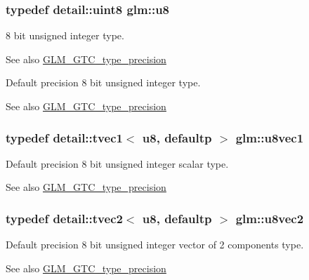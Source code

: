 \subsubsection[{\texorpdfstring{u8}{u8}}]{\setlength{\rightskip}{0pt plus 5cm}typedef detail\+::uint8 {\bf glm\+::u8}}\hypertarget{group__gtc__type__precision_ga5e3dc67373d5068997d2d9f41c9024d2}{}\label{group__gtc__type__precision_ga5e3dc67373d5068997d2d9f41c9024d2}
8 bit unsigned integer type. \begin{DoxySeeAlso}{See also}
\hyperlink{group__gtc__type__precision}{G\+L\+M\+\_\+\+G\+T\+C\+\_\+type\+\_\+precision}
\end{DoxySeeAlso}
Default precision 8 bit unsigned integer type. \begin{DoxySeeAlso}{See also}
\hyperlink{group__gtc__type__precision}{G\+L\+M\+\_\+\+G\+T\+C\+\_\+type\+\_\+precision} 
\end{DoxySeeAlso}
\subsubsection[{\texorpdfstring{u8vec1}{u8vec1}}]{\setlength{\rightskip}{0pt plus 5cm}typedef detail\+::tvec1$<$ u8, defaultp $>$ {\bf glm\+::u8vec1}}\hypertarget{group__gtc__type__precision_gaf0155c700da11c0b5518a777d1f0cd23}{}\label{group__gtc__type__precision_gaf0155c700da11c0b5518a777d1f0cd23}
Default precision 8 bit unsigned integer scalar type. \begin{DoxySeeAlso}{See also}
\hyperlink{group__gtc__type__precision}{G\+L\+M\+\_\+\+G\+T\+C\+\_\+type\+\_\+precision} 
\end{DoxySeeAlso}
\subsubsection[{\texorpdfstring{u8vec2}{u8vec2}}]{\setlength{\rightskip}{0pt plus 5cm}typedef detail\+::tvec2$<$ u8, defaultp $>$ {\bf glm\+::u8vec2}}\hypertarget{group__gtc__type__precision_gaa7ea171741c23b5bb2a3c91fe8c84e8a}{}\label{group__gtc__type__precision_gaa7ea171741c23b5bb2a3c91fe8c84e8a}
Default precision 8 bit unsigned integer vector of 2 components type. \begin{DoxySeeAlso}{See also}
\hyperlink{group__gtc__type__precision}{G\+L\+M\+\_\+\+G\+T\+C\+\_\+type\+\_\+precision} 
\end{DoxySeeAlso}
